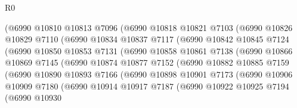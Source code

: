 \begin{lexlean}{R0}
\begin{coremodule}
                    (@6990
                      @10810
                      @10813
                      @7096
                      (@6990
                        @10818
                        @10821
                        @7103
                        (@6990
                          @10826
                          @10829
                          @7110
                          (@6990
                            @10834
                            @10837
                            @7117
                            (@6990
                              @10842
                              @10845
                              @7124
                              (@6990
                                @10850
                                @10853
                                @7131
                                (@6990
                                  @10858
                                  @10861
                                  @7138
                                  (@6990
                                    @10866
                                    @10869
                                    @7145
                                    (@6990
                                      @10874
                                      @10877
                                      @7152
                                      (@6990
                                        @10882
                                        @10885
                                        @7159
                                        (@6990
                                          @10890
                                          @10893
                                          @7166
                                          (@6990
                                            @10898
                                            @10901
                                            @7173
                                            (@6990
                                              @10906
                                              @10909
                                              @7180
                                              (@6990
                                                @10914
                                                @10917
                                                @7187
                                                (@6990
                                                  @10922
                                                  @10925
                                                  @7194
                                                  (@6990
                                                    @10930

\end{coremodule}
\end{lexlean}
